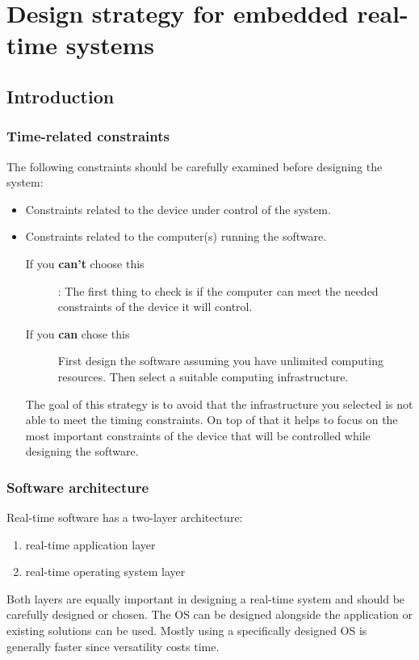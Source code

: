\documentclass[../main.tex]{subfiles}
\begin{document}
\chapter{Design strategy for embedded real-time systems}

\section{Introduction}

\subsection{Time-related constraints}
The following constraints should be carefully examined before designing the system: 
\begin{itemize}
	\item Constraints related to the device under control of the system. 
	\item Constraints related to the computer(s) running the software. 
		\begin{description}
			\item[If you \textbf{can't} choose this]: The first thing to check is if the computer can meet the needed constraints of the device it will control.
				\item[If you \textbf{can}  chose this] First design the software assuming you have unlimited computing resources. Then select a suitable computing infrastructure.
		\end{description} 
		The goal of this strategy is to avoid that the infrastructure you selected is not able to meet the  timing constraints.
	On top of that it helps to focus on the most important constraints of the device that will be controlled while designing the software.
\end{itemize}




\subsection{Software architecture}
Real-time software has a two-layer architecture: 
\begin{enumerate}
	\item real-time  application layer
	\item real-time operating  system layer
\end{enumerate}

Both layers are equally important in designing a real-time system and should be carefully designed or chosen.
The OS can be designed alongside the application or existing solutions can be used. 
Mostly using a specifically designed OS is generally faster since versatility costs time.
\end{document}
